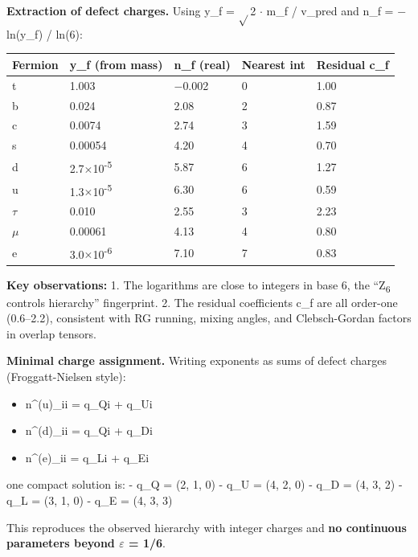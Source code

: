 \documentclass[11pt,a4paper]{article}
\theoremstyle{remark}
\providecommand{\tightlist}{%
  \setlength{\itemsep}{0pt}\setlength{\parskip}{0pt}}
\begin{document}
\textbf{Extraction of defect charges.} Using y\_f = \ensuremath{\sqrt{}}2 \ensuremath{\cdot} m\_f / v\_pred and n\_f = \ensuremath{-}ln(y\_f) / ln(6):

{\def\LTcaptype{none} %
\begin{longtable}[]{@{}lllll@{}}
\toprule\noalign{}
Fermion & y\_f (from mass) & n\_f (real) & Nearest int & Residual c\_f \\
\midrule\noalign{}
\endhead
\bottomrule\noalign{}
\endlastfoot
t & 1.003 & \ensuremath{-}0.002 & 0 & 1.00 \\
b & 0.024 & 2.08 & 2 & 0.87 \\
c & 0.0074 & 2.74 & 3 & 1.59 \\
s & 0.00054 & 4.20 & 4 & 0.70 \\
d & 2.7\ensuremath{\times}10\textsuperscript{-5} & 5.87 & 6 & 1.27 \\
u & 1.3\ensuremath{\times}10\textsuperscript{-5} & 6.30 & 6 & 0.59 \\
\ensuremath{\tau} & 0.010 & 2.55 & 3 & 2.23 \\
\ensuremath{\mu} & 0.00061 & 4.13 & 4 & 0.80 \\
e & 3.0\ensuremath{\times}10\textsuperscript{-6} & 7.10 & 7 & 0.83 \\
\end{longtable}
}

\textbf{Key observations:}
1. The logarithms are close to integers in base 6, the ``Z\textsubscript{6} controls hierarchy''
fingerprint.
2. The residual coefficients c\_f are all order-one (0.6--2.2), consistent with
RG running, mixing angles, and Clebsch-Gordan factors in overlap tensors.

\textbf{Minimal charge assignment.} Writing exponents as sums of defect charges (Froggatt-Nielsen style):

\begin{itemize}
\tightlist
\item
  n\^{}(u)\_ii = q\_Qi + q\_Ui
\item
  n\^{}(d)\_ii = q\_Qi + q\_Di
\item
  n\^{}(e)\_ii = q\_Li + q\_Ei
\end{itemize}

one compact solution is:
- q\_Q = (2, 1, 0)
- q\_U = (4, 2, 0)
- q\_D = (4, 3, 2)
- q\_L = (3, 1, 0)
- q\_E = (4, 3, 3)

This reproduces the observed hierarchy with integer charges and \textbf{no continuous
parameters beyond \ensuremath{\varepsilon} = 1/6}.
\end{document}

